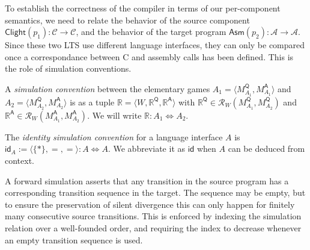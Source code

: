 \documentclass[sigplan,10pt,review,anonymous]{acmart}
\newcommand{\kw}[1]{\ensuremath{ \mathsf{#1} }}
\begin{document}
To establish the correctness of the compiler
in terms of our per-component semantics,
we need to relate the behavior of the source component
$\kw{Clight}(p_1) : \mathcal{C} \rightarrow \mathcal{C}$,
and the behavior of the target program
$\kw{Asm}(p_2) : \mathcal{A} \rightarrow \mathcal{A}$.
Since these two LTS
use different language interfaces,
they can only be compared once a correspondance between
C and assembly calls has been defined.
This is the role of simulation conventions.

\begin{definition} %
A \emph{simulation convention} between the elementary games
$A_1 = \langle M_{A_1}^\kw{Q}, M_{A_1}^\kw{A} \rangle$ and
$A_2 = \langle M_{A_2}^\kw{Q}, M_{A_2}^\kw{A} \rangle$
is as a tuple $\mathbb{R} = \langle W, \mathbb{R}^\kw{Q}, \mathbb{R}^\kw{A} \rangle$
with $\mathbb{R}^\kw{Q} \in \mathcal{R}_W(M_{A_1}^\kw{Q}, M_{A_2}^\kw{Q})$
and $\mathbb{R}^\kw{A} \in \mathcal{R}_W(M_{A_1}^\kw{A}, M_{A_2}^\kw{A})$.
We will write $\mathbb{R} : A_1 \Leftrightarrow A_2$.
\end{definition}

\begin{definition} %
The \emph{identity simulation convention} for
a language interface $A$ is
$\kw{id}_A := \langle \{*\}, {=}, {=} \rangle : A \Leftrightarrow A$.
We abbreviate it as $\kw{id}$ when $A$ can be deduced
from context.
\end{definition}


A forward simulation asserts that any transition in the source program
has a corresponding transition sequence in the target.
The sequence may be empty,
but to ensure the preservation of silent divergence
this can only happen for finitely many consecutive source transitions.
This is enforced by indexing the simulation relation
over a well-founded order,
and requiring the index to decrease
whenever an empty transition sequence is used.
\end{document}
